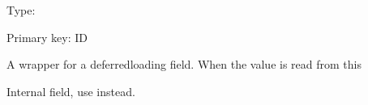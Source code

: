 \documentclass[letterpaper,10pt,russian]{sphinxmanual}
\begin{document}
\begin{fulllineitems}
\begin{fulllineitems}
\label{\detokenize{myapp:polls.models.Choice.id}}
\pysigstartsignatures
\pysigline
{}
\pysigstopsignatures
\sphinxAtStartPar
Type: 

\sphinxAtStartPar
Primary key: ID

\sphinxAtStartPar
A wrapper for a deferred\sphinxhyphen{}loading field. When the value is read from this

\end{fulllineitems}


\begin{fulllineitems}
\label{\detokenize{myapp:polls.models.Choice.objects}}
\pysigstartsignatures
\pysigline
{}
\pysigstopsignatures
\end{fulllineitems}


\begin{fulllineitems}
\label{\detokenize{myapp:polls.models.Choice.question_id}}
\pysigstartsignatures
\pysigline
{}
\pysigstopsignatures
\sphinxAtStartPar
Internal field, use {\hyperref[\detokenize{myapp:polls.models.Choice.question}]{}} instead.

\end{fulllineitems}


\end{fulllineitems}

\end{document}
